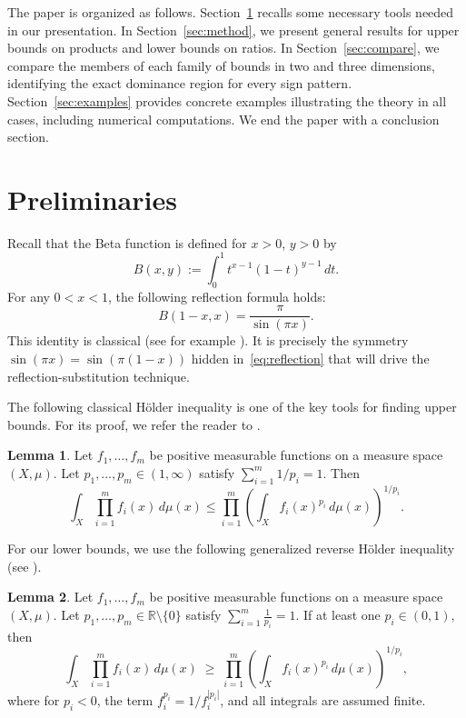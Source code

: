 \documentclass[12pt]{amsart}
\theoremstyle{definition}
\newtheorem{lemma}{Lemma}[section]
\begin{document}
The paper is organized as follows. Section~\ref{sec:prelim} recalls some necessary tools needed in our presentation. In Section~\ref{sec:method}, we present general results for upper bounds on products and lower bounds on ratios. In Section~\ref{sec:compare}, we compare the members of each family of bounds in two and three dimensions, identifying the exact dominance region for every sign pattern. Section~\ref{sec:examples} provides concrete examples illustrating the theory in all cases, including numerical computations. We end the paper with a conclusion section.


\section{Preliminaries}
\label{sec:prelim}

Recall that the Beta function is defined for $x>0$, $y>0$ by
\[
B(x,y):=\int_0^1 t^{x-1}(1-t)^{y-1}\,dt.
\]
For any $0<x<1$, the following reflection formula holds:
\begin{equation}\label{eq:reflection}
B(1-x,x)=\frac{\pi}{\sin(\pi x)}.
\end{equation}
This identity is classical (see for example \cite{Artin1964,BohrMollerup1922}). It is precisely the symmetry $\sin(\pi x)=\sin(\pi(1-x))$ hidden in~\eqref{eq:reflection} that will drive the reflection-substitution technique.

The following classical H\"older inequality is one of the key tools for finding upper bounds. For its proof, we refer the reader to \cite{HLP1934,Rudin1987}.

\begin{lemma}\label{lem:holder}
Let $f_1,\ldots,f_m$ be positive measurable functions on a measure space $(X,\mu)$.
Let $p_1,\ldots,p_m \in (1,\infty)$ satisfy $\sum_{i=1}^{m} 1/p_i = 1$. Then
\[
\int_X \prod_{i=1}^{m} f_i(x) \, d\mu(x) \leq \prod_{i=1}^{m} \left(\int_X f_i(x)^{p_i} \, d\mu(x)\right)^{1/p_i}.
\]
\end{lemma}

For our lower bounds, we use the following generalized reverse H\"older inequality (see \cite{HLP1934}).

\begin{lemma}\label{lem:reverseholder}
Let $f_1, \dots, f_m$ be positive measurable functions on a measure space $(X, \mu)$.
Let $p_1, \dots, p_m \in \mathbb{R} \setminus \{0\}$ satisfy $\displaystyle\sum_{i=1}^m \frac{1}{p_i} = 1$.
If at least one $p_i \in (0,1)$, then
\[
\int_X \prod_{i=1}^m f_i(x) \, d\mu(x) \;\ge\; \prod_{i=1}^m \left( \int_X f_i(x)^{p_i} \, d\mu(x) \right)^{1/p_i},
\]
where for $p_i < 0$, the term $f_i^{p_i} = 1 / f_i^{|p_i|}$, and all integrals are assumed finite.
\end{lemma}
\end{document}
